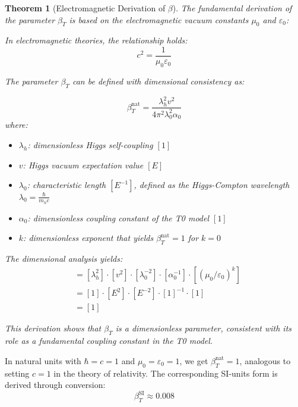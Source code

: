 \documentclass[12pt,a4paper]{article}
\newtheorem{theorem}{Theorem}[section]
\begin{document}
	\begin{theorem}[Electromagnetic Derivation of \(\beta\)]
		The fundamental derivation of the parameter \(\beta_T\) is based on the electromagnetic vacuum constants \(\mu_0\) and \(\varepsilon_0\):
		
		In electromagnetic theories, the relationship holds:
		\begin{equation}
			c^2 = \frac{1}{\mu_0 \varepsilon_0}
		\end{equation}
		
		The parameter \(\beta_T\) can be defined with dimensional consistency as:
		
		\begin{equation}
			\beta_T^{\text{nat}} = \frac{\lambda_h^2 v^2}{4\pi^2 \lambda_0^2 \alpha_0}
		\end{equation}
		where:
		\begin{itemize}
			\item \(\lambda_h\): dimensionless Higgs self-coupling $[1]$
			\item \(v\): Higgs vacuum expectation value $[E]$
			\item \(\lambda_0\): characteristic length $[E^{-1}]$, defined as the Higgs-Compton wavelength \(\lambda_0 = \frac{\hbar}{m_h c}\)
			\item \(\alpha_0\): dimensionless coupling constant of the T0 model $[1]$
			\item \(k\): dimensionless exponent that yields \(\beta_T^{\text{nat}} = 1\) for \(k=0\)
		\end{itemize}
		
		The dimensional analysis yields:
		\begin{align}
			[\beta_T^{\text{nat}}] &= [\lambda_h^2] \cdot [v^2] \cdot [\lambda_0^{-2}] \cdot [\alpha_0^{-1}] \cdot [(\mu_0/\varepsilon_0)^{k}] \\
			&= [1] \cdot [E^2] \cdot [E^{-2}] \cdot [1]^{-1} \cdot [1] \\
			&= [1]
		\end{align}
		
		This derivation shows that \(\beta_T\) is a dimensionless parameter, consistent with its role as a fundamental coupling constant in the T0 model.
	\end{theorem}
	
	In natural units with \(\hbar = c = 1\) and \(\mu_0 = \varepsilon_0 = 1\), we get \(\beta_T^{\text{nat}} = 1\), analogous to setting \(c = 1\) in the theory of relativity. The corresponding SI-units form is derived through conversion:
	\begin{equation}
		\beta_T^{\text{SI}} \approx 0.008
	\end{equation}
	
\end{document}
